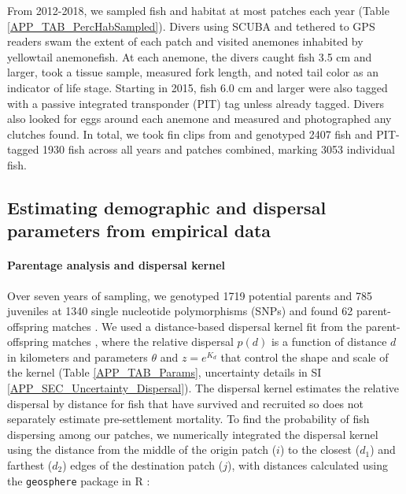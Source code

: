 \documentclass[12pt, oneside]{article}   	%
\begin{document}
From 2012-2018, we sampled fish and habitat at most patches each year (Table \ref{APP_TAB_PercHabSampled}). Divers using SCUBA and tethered to GPS readers swam the extent of each patch and visited anemones inhabited by yellowtail anemonefish. At each anemone, the divers caught fish 3.5 cm and larger, took a tissue sample, measured fork length, and noted tail color as an indicator of life stage. Starting in 2015, fish 6.0 cm and larger were also tagged with a passive integrated transponder (PIT) tag unless already tagged. Divers also looked for eggs around each anemone and measured and photographed any clutches found. In total, we took fin clips from and genotyped 2407 fish and PIT-tagged 1930 fish across all years and patches combined, marking 3053 individual fish. %

\subsection*{Estimating demographic and dispersal parameters from empirical data} 

\paragraph*{Parentage analysis and dispersal kernel}  %

Over seven years of sampling, we genotyped 1719 potential parents and 785 juveniles at 1340 single nucleotide polymorphisms (SNPs) and found 62 parent-offspring matches \citep{catalanoInPrepconnectivity}. We used a distance-based dispersal kernel fit from the parent-offspring matches \citep{catalanoInPrepconnectivity, bode2018estimating}, where the relative dispersal $p(d)$ is a function of distance $d$ in kilometers and parameters $\theta$ and $z = e^{K_d}$ that control the shape and scale of the kernel (Table \ref{APP_TAB_Params}, uncertainty details in SI \ref{APP_SEC_Uncertainty_Dispersal}). The dispersal kernel estimates the relative dispersal by distance for fish that have survived and recruited so does not separately estimate pre-settlement mortality. To find the probability of fish dispersing among our patches, we numerically integrated the dispersal kernel using the distance from the middle of the origin patch ($i$) to the closest ($d_1$) and farthest ($d_2$) edges of the destination patch ($j$), with distances calculated using the \texttt{geosphere} package in R \citep{geosphere2017R}:
\end{document}
